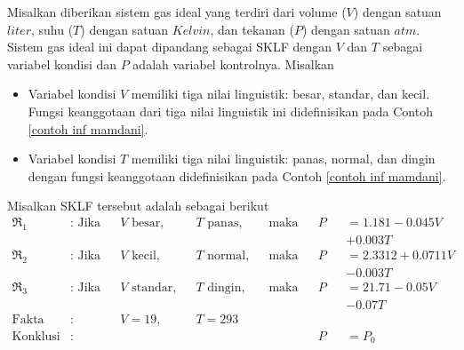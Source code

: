\begin{contoh} \label{contoh: inf tsk}
Misalkan diberikan sistem gas ideal yang terdiri dari volume ($V$) dengan satuan $liter$, suhu ($T$) dengan satuan $Kelvin$, dan tekanan ($P$) dengan satuan $atm$. Sistem gas ideal ini dapat dipandang sebagai SKLF dengan $V$ dan $T$ sebagai variabel kondisi dan $P$ adalah variabel kontrolnya. Misalkan
\begin{itemize}
    \item Variabel kondisi $V$ memiliki tiga nilai linguistik: besar, standar, dan kecil. Fungsi keanggotaan dari tiga nilai linguistik ini didefinisikan pada Contoh \ref{contoh inf mamdani}.
    \item Variabel kondisi $T$ memiliki tiga nilai linguistik: panas, normal, dan dingin dengan fungsi keanggotaan didefinisikan pada Contoh \ref{contoh inf mamdani}.
\end{itemize}

Misalkan SKLF tersebut adalah sebagai berikut
\begin{align*}
\Re_1 &: \text{ Jika} && V \text{ besar,} && T \text{ panas,}&&\text{maka}&&P&&= \num{1,181} - \num{0,045}V\\
 & && && && && && + \num{0,003}T\\
\Re_2 &: \text{ Jika} && V \text{ kecil,} && T \text{ normal,}&&\text{maka}&&P&&= \num{2,3312} + \num{0,0711}V\\
 & && && && && && - \num{0,003}T\\
\Re_3 &: \text{ Jika} && V \text{ standar,} && T \text{ dingin,}&&\text{maka}&&P&&= \num{21,71} - \num{0,05}V\\
 & && && && && && - \num{0,07}T\\
\text{Fakta} &: && V = 19\text{,} && T = 293\\
\hline
\text{Konklusi} &: && && && && P &&= P_0
\end{align*}


\end{contoh}
